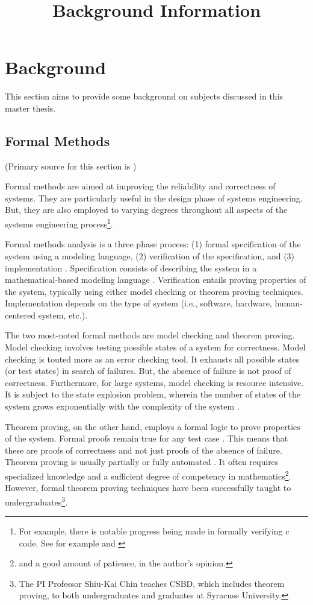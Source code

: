 \documentclass[../../main/main.tex]{subfiles}
\begin{document}
\title{Background Information}

\chapter{Background}\label{chp:background}
This section aims to provide some background on subjects discussed in this master thesis.  

\section{Formal Methods}
(Primary source for this section is \cite{formalCarnegie})

Formal methods are aimed at improving the reliability and correctness of systems\cite{formalmethodslcarke}.  They are particularly useful in the design phase of systems engineering.  But, they are also employed to varying degrees throughout all aspects of the systems engineering process\footnote{For example, there is notable progress being made in formally verifying c code.  See for example \cite{jvmcmv} and \cite{VARVEL}}.  

Formal methods analysis is a three phase process: (1) formal specification of the system using a modeling language, (2) verification of the specification, and (3) implementation \cite{formalCarnegie}.  Specification consists of describing the system in a mathematical-based modeling language \cite{formalCarnegie}.  Verification entails proving properties of the system, typically using either model checking or theorem proving techniques.  Implementation depends on the type of system (i.e., software, hardware, human-centered system, etc.).

The two most-noted formal methods are model checking and theorem proving.  Model checking involves testing possible states of a system for correctness.  Model checking is touted more as an error checking tool.  It exhausts all possible states (or test states) in search of failures.  But, the absence of failure is not proof of correctness.  Furthermore, for large systems, model checking is resource intensive.  It is subject to the state explosion problem, wherein the number of states of the system grows exponentially with the complexity of the system \cite{stateexplosion}. 

Theorem proving, on the other hand, employs a formal logic to prove properties of the system.  Formal proofs remain true for any test case \cite{formalCarnegie}.  This means that these are proofs of correctness and not just proofs of the absence of failure.  Theorem proving is usually partially or fully automated \cite{wikiformalmethods}.  It often requires specialized knowledge and a sufficient degree of competency in mathematics\footnote{and a good amount of patience, in the author's opinion.}. However, formal theorem proving techniques have been successfully taught to undergraduates\footnote{The PI Professor Shiu-Kai Chin teaches CSBD, which includes theorem proving, to both undergraduates and graduates at Syracuse University.}.  
\end{document}
